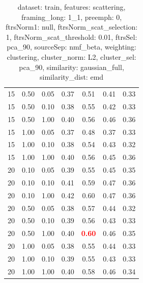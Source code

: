 \documentclass[12pt,a4paper,fleqn]{tufte-handout}
\begin{document}
\begin{table}
\begin{center}
\begin{tabular}{lllcccc}
15 & 0.50 & 0.05 & 0.37 & 0.51 & 0.41 & 0.33 \\              
15 & 0.50 & 0.10 & 0.38 & 0.55 & 0.42 & 0.33 \\              
15 & 0.50 & 1.00 & 0.40 & 0.56 & 0.46 & 0.36 \\              
15 & 1.00 & 0.05 & 0.37 & 0.48 & 0.37 & 0.33 \\              
15 & 1.00 & 0.10 & 0.38 & 0.54 & 0.43 & 0.32 \\              
15 & 1.00 & 1.00 & 0.40 & 0.56 & 0.45 & 0.36 \\              
20 & 0.10 & 0.05 & 0.39 & 0.55 & 0.45 & 0.35 \\              
20 & 0.10 & 0.10 & 0.41 & 0.59 & 0.47 & 0.36 \\              
20 & 0.10 & 1.00 & 0.42 & 0.60 & 0.47 & 0.36 \\              
20 & 0.50 & 0.05 & 0.38 & 0.57 & 0.44 & 0.32 \\              
20 & 0.50 & 0.10 & 0.39 & 0.56 & 0.43 & 0.33 \\              
20 & 0.50 & 1.00 & 0.40 & \textbf{\textcolor{red}{0.60}} & 0.46 & 0.35 \\              
20 & 1.00 & 0.05 & 0.38 & 0.55 & 0.44 & 0.33 \\              
20 & 1.00 & 0.10 & 0.39 & 0.55 & 0.43 & 0.33 \\              
20 & 1.00 & 1.00 & 0.40 & 0.58 & 0.46 & 0.34 \\              
\end{tabular}              
\end{center}              
\caption{dataset: train, features: scattering, framing\_long: 1\_1, preemph: 0, ftrsNorm1: null, ftrsNorm\_scat\_selection: 1, ftrsNorm\_scat\_threshold: 0.01, ftrsSel: pca\_90, sourceSep: nmf\_beta, weighting: clustering, cluster\_norm: L2, cluster\_sel: pca\_90, similarity: gaussian\_full, similarity\_dist: emd}              
\label{datasetrFeaturscFraminlong1_1Preemp0Ftrsnorm1nuFtrsnoscatselect1Ftrsnoscatthresh0.01Ftrsselpc90SourcesepnmbeWeightclClustenormL2Clusteselpc90SimilagafuSimiladistem}              
\end{table}              
 
\end{document}
